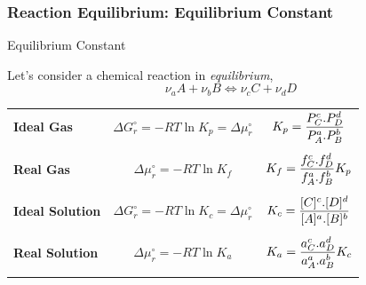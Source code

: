 \documentclass[10pt,compress,unknownkeysallowed]{beamer}
\begin{document}
\begin{frame}
  \frametitle{Reaction Equilibrium: Equilibrium Constant}
       \begin{block}{\begin{center}Equilibrium Constant\end{center}}
            Let's consider a chemical reaction in {\it equilibrium},
               \begin{displaymath}
                   \nu_{a} A + \nu_{b} B \Longleftrightarrow \nu_{c} C + \nu_{d} D 
               \end{displaymath} 
          \begin{center}
            \begin{tabular}{l | c c}
               \hline
                  {\bf Ideal Gas} & $\Delta G_{r}^{\circ}=-RT\ln{K_{p}}=\Delta\mu_{r}^{\circ}$ & $K_{p} = \displaystyle\frac{P_{C}^{c}.P_{D}^{d}}{P_{A}^{a}.P_{B}^{b}}$ \\
                                  &                                                &                                                         \\
                  {\bf Real Gas}  & $\Delta \mu_{r}^{\circ}=-RT\ln{K_{f}}$               &  $K_{f} = \displaystyle\frac{f_{C}^{c}.f_{D}^{d}}{f_{A}^{a}.f_{B}^{b}} K_{p}$ \\
                                  &                                                &                                                         \\
                  {\bf Ideal Solution} & $\Delta G_{r}^{\circ}=-RT\ln{K_{c}}=\Delta\mu_{r}^{\circ}$ & $K_{c} = \displaystyle\frac{[C]^{c}.[D]^{d}}{[A]^{a}.[B]^{b}}$ \\
                                  &                                                &                                                         \\
                  {\bf Real Solution} & $\Delta\mu_{r}^{\circ}=-RT\ln{K_{a}}$             &  $K_{a} = \displaystyle\frac{a_{C}^{c}.a_{D}^{d}}{a_{A}^{a}.a_{B}^{b}} K_{c}$\\
                                  &                                                &                                                         \\
               \hline
            \end{tabular}
           \end{center}
 
       \end{block}
\end{frame}
\end{document}
